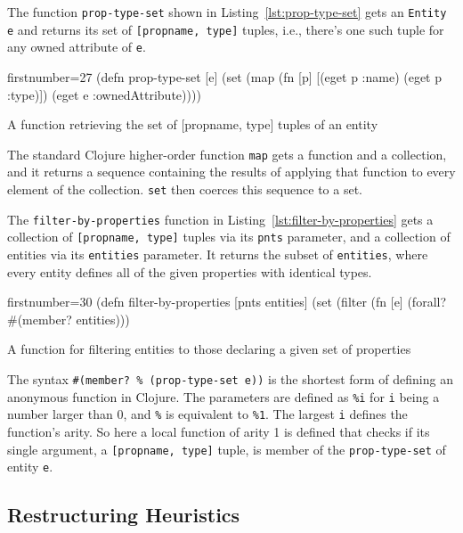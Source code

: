 \documentclass[11pt]{article}
\begin{document}
The function \verb|prop-type-set| shown in Listing~\ref{lst:prop-type-set} gets
an \verb|Entity e| and returns its set of \verb|[propname, type]| tuples, i.e.,
there's one such tuple for any owned attribute of \verb|e|.

\begin{listing}[h!tbp]
  \begin{clojurecode*}{firstnumber=27}
(defn prop-type-set [e]
  (set (map (fn [p] [(eget p :name) (eget p :type)])
            (eget e :ownedAttribute))))
  \end{clojurecode*}
  \caption{A function retrieving the set of \textsf{[propname, type]} tuples of
    an entity}
    \label{lst:prop-type-set}
\end{listing}

The standard Clojure higher-order function \verb|map| gets a function and a
collection, and it returns a sequence containing the results of applying that
function to every element of the collection.  \verb|set| then coerces this
sequence to a set.


The \verb|filter-by-properties| function in
Listing~\ref{lst:filter-by-properties} gets a collection of
\verb|[propname, type]| tuples via its \verb|pnts| parameter, and a collection
of entities via its \verb|entities| parameter.  It returns the subset of
\verb|entities|, where every entity defines all of the given properties with
identical types.

\begin{listing}[htbp]
  \begin{clojurecode*}{firstnumber=30}
(defn filter-by-properties [pnts entities]
  (set (filter (fn [e]
                 (forall? #(member? %
               entities)))
  \end{clojurecode*}
  \caption{A function for filtering entities to those declaring a given set of
    properties}
  \label{lst:filter-by-properties}
\end{listing}


The syntax \verb|#(member? % (prop-type-set e))| is the shortest form of
defining an anonymous function in Clojure.  The parameters are defined as
\verb|%i| for \verb|i| being
a number larger than 0, and \verb|%| is equivalent
to \verb|%1|.  The largest \verb|i| defines the function's arity.  So here a
local function of arity 1 is defined that checks if its single argument, a
\verb|[propname, type]| tuple, is member of the \verb|prop-type-set| of entity
\verb|e|.


\subsection{Restructuring Heuristics}
\label{sec:restructuring-heuristics}
\end{document}
